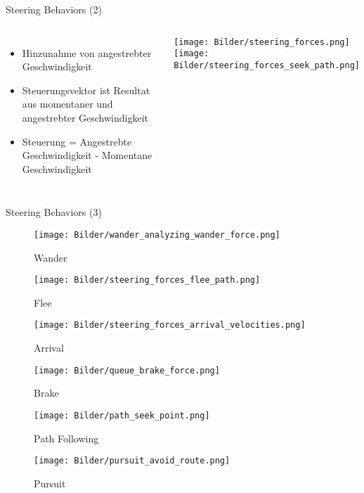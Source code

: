 \begin{frame}{Steering Behaviors (2)}
\begin{columns}
\begin{itemize}
    \item Hinzunahme von angestrebter Geschwindigkeit
    \item Steuerungsvektor ist Resultat aus momentaner und angestrebter Geschwindigkeit
    \item Steuerung = Angestrebte Geschwindigkeit - Momentane Geschwindigkeit
\end{itemize}
\begin{overprint}
\texttt{[image: Bilder/steering\_forces.png]}
\texttt{[image: Bilder/steering\_forces\_seek\_path.png]}
\end{overprint}
\end{columns}
\end{frame}
\begin{frame}{Steering Behaviors (3)}
\begin{figure}

  \centering
  
  \begin{minipage}[b]{0.25\textwidth}
    \texttt{[image: Bilder/wander\_analyzing\_wander\_force.png]}
    \caption{Wander}
  \end{minipage}
  \hfill
  \begin{minipage}[b]{0.25\textwidth}
    \texttt{[image: Bilder/steering\_forces\_flee\_path.png]}
    \caption{Flee}
  \end{minipage}
  \hfill
  \begin{minipage}[b]{0.25\textwidth}
    \texttt{[image: Bilder/steering\_forces\_arrival\_velocities.png]}
    \caption{Arrival}
  \end{minipage}
    
\end{figure}
\begin{figure}

  \centering
  
  \begin{minipage}[b]{0.25\textwidth}
    \texttt{[image: Bilder/queue\_brake\_force.png]}
    \caption{Brake}
  \end{minipage}
  \hfill
  \begin{minipage}[b]{0.25\textwidth}
    \texttt{[image: Bilder/path\_seek\_point.png]}
    \caption{Path Following}
  \end{minipage}
  \hfill
  \begin{minipage}[b]{0.25\textwidth}
    \texttt{[image: Bilder/pursuit\_avoid\_route.png]}
    \caption{Pursuit}
  \end{minipage}
    
\end{figure}
\end{frame}

